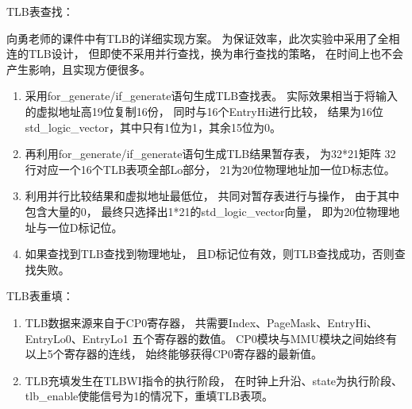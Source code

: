            TLB表查找：%
            \begin{minipage}[t]{0.8\linewidth}

                向勇老师的课件中有TLB的详细实现方案。%
                为保证效率，此次实验中采用了全相连的TLB设计，%
                但即使不采用并行查找，换为串行查找的策略，%
                在时间上也不会产生影响，且实现方便很多。

                \begin{enumerate}
                \item
                    采用for\_generate/if\_generate语句生成TLB查找表。%
                    实际效果相当于将输入的虚拟地址高19位复制16份，%
                    同时与16个EntryHi进行比较，%
                    结果为16位std\_logic\_vector，其中只有1位为1，其余15位为0。%
                \item
                    再利用for\_generate/if\_generate语句生成TLB结果暂存表，%
                    为32*21矩阵%
                    32行对应一个16个TLB表项全部Lo部分，%
                    21为20位物理地址加一位D标志位。%
                \item
                    利用并行比较结果和虚拟地址最低位，%
                    共同对暂存表进行与操作，%
                    由于其中包含大量的0，%
                    最终只选择出1*21的std\_logic\_vector向量，%
                    即为20位物理地址与一位D标记位。%
                \item
                    如果查找到TLB查找到物理地址，%
                    且D标记位有效，则TLB查找成功，否则查找失败。%
                \end{enumerate}
            \end{minipage}

            TLB表重填：%
            \begin{minipage}[t]{0.8\linewidth}
                \begin{enumerate}
                \item
                    TLB数据来源来自于CP0寄存器，%
                    共需要Index、PageMask、EntryHi、EntryLo0、EntryLo1%
                    五个寄存器的数值。%
                    CP0模块与MMU模块之间始终有以上5个寄存器的连线，%
                    始终能够获得CP0寄存器的最新值。%
                \item
                    TLB充填发生在TLBWI指令的执行阶段，%
                    在时钟上升沿、state为执行阶段、%
                    tlb\_enable使能信号为1的情况下，重填TLB表项。%
                \end{enumerate}
            \end{minipage}

